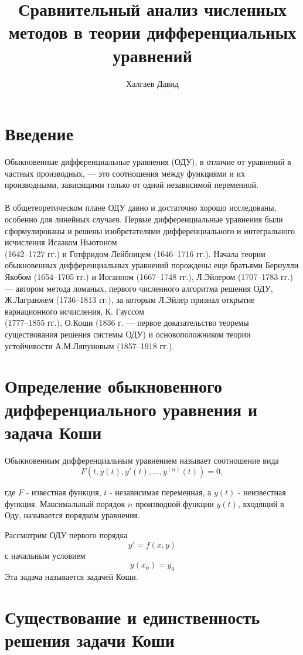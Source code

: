 \documentclass[a4paper, 14pt]{extarticle}
\title{Сравнительный анализ численных методов в теории дифференциальных уравнений}
\author{Халгаев Давид}
\begin{document}
\maketitle

\section{Введение}
Обыкновенные дифференциальные уравнения (ОДУ), в отличие от уравнений в частных производных, — это 
соотношения между функциями и их производными, зависящими только от одной независимой переменной. 

\paragraph{}
В общетеоретическом плане ОДУ давно и достаточно хорошо исследованы, особенно для линейных 
случаев. Первые дифференциальные уравнения были сформулированы и решены изобретателями 
дифференциального и интегрального исчисления Исааком Ньютоном \\ (1642–1727 гг.) и Готфридом 
Лейбницем (1646–1716 гг.). Начала теории обыкновенных дифференциальных уравнений порождены еще 
братьями Бернулли Якобом (1654–1705 гг.)
и Иоганном (1667–1748 гг.), Л.Эйлером (1707–1783 гг.) — автором
метода ломаных, первого численного алгоритма решения ОДУ,
Ж.Лагранжем (1736–1813 гг.), за которым Л.Эйлер признал открытие вариационного исчисления, К. 
Гауссом \\ (1777–1855 гг.), О.Коши (1836 г. — первое доказательство теоремы существования решения 
системы ОДУ) и основоположником теории устойчивости А.М.Ляпуновым (1857–1918 гг.).

\section{Определение обыкновенного дифференциального уравнения и задача Коши}
Обыкновенным дифференциальным уравнением называет соотношение вида
$$ F(t,y(t), y'(t),\ldots,y^{(n)}(t)) = 0, $$

где $F$ - известная функция, $t$ - независимая переменная, а $y(t)$ - неизвестная функция.
Максимальный порядок $n$ производной функции $y(t)$, входящий в Оду, называется
порядком уравнения.

\par 
Рассмотрим ОДУ первого порядка
\[y'=f(x,y)\]
с начальным условием
\[y(x_0)=y_0\]
Эта задача называется задачей Коши.

\section{Существование и единственность решения задачи Коши}
\end{document}
